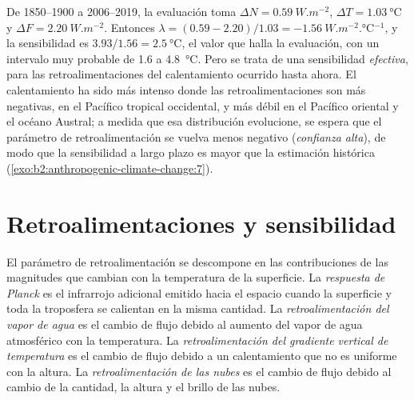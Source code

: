 De 1850--1900 a 2006--2019, la evaluación toma $\Delta N = \qty{0.59}{W.m^{-2}}$, $\Delta T =
\qty{1.03}{\celsius}$ y $\Delta F = \qty{2.20}{W.m^{-2}}$. Entonces $\lambda = (0.59 - 2.20)/1.03 =
\qty{-1.56}{W.m^{-2}.\celsius^{-1}}$, y la sensibilidad es $3.93/1.56 = \qty{2.5}{\celsius}$,
el valor que halla la evaluación, con un intervalo muy probable de 1.6 a \qty{4.8}{\celsius}. Pero se trata de
una sensibilidad \emph{efectiva}, para las retroalimentaciones del calentamiento ocurrido hasta ahora. El calentamiento ha sido
más intenso donde las retroalimentaciones son más negativas, en el Pacífico tropical occidental, y más débil en el
Pacífico oriental y el océano Austral; a medida que esa distribución evolucione, se espera que el parámetro de retroalimentación
se vuelva menos negativo (\emph{confianza alta}), de modo que la sensibilidad a largo plazo es mayor que la
estimación histórica (\cref{exo:b2:anthropogenic-climate-change:7}).

\section{Retroalimentaciones y sensibilidad}\label{sec:b2:anthropogenic-climate-change:feedbacks}

\begin{definition}\label{def:b2:anthropogenic-climate-change:feedbacks}
El parámetro de retroalimentación se descompone en las contribuciones de las magnitudes que cambian con la
temperatura de la superficie. La \emph{respuesta de Planck} es el infrarrojo adicional
emitido hacia el espacio cuando la superficie y toda la troposfera se calientan en la misma cantidad. La
\emph{retroalimentación del vapor de agua} es el cambio de flujo debido al aumento
del vapor de agua atmosférico con la temperatura. La \emph{retroalimentación del gradiente vertical de temperatura}
 es el cambio de flujo debido a un calentamiento que no es uniforme con la altura. La \emph{retroalimentación de las
nubes} es el cambio de flujo debido al cambio de la cantidad, la altura y el
brillo de las nubes.
\end{definition}

